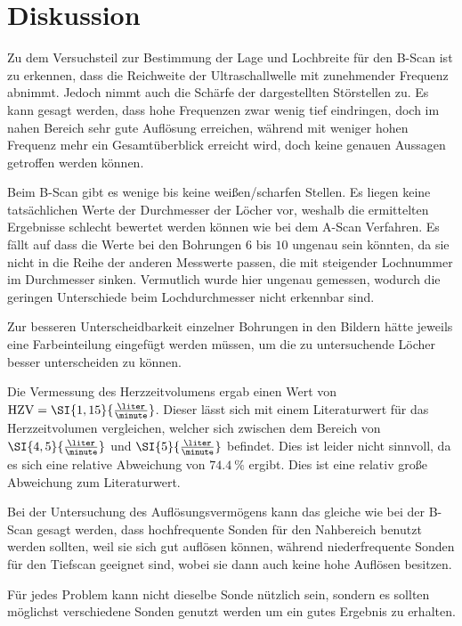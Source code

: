 \section{Diskussion}
\label{sec:Diskussion}
Zu dem Versuchsteil zur Bestimmung der Lage und Lochbreite für den B-Scan ist zu erkennen, dass die Reichweite der Ultraschallwelle mit zunehmender Frequenz abnimmt. Jedoch nimmt auch die Schärfe der dargestellten Störstellen zu. Es kann gesagt werden, dass hohe Frequenzen zwar wenig tief eindringen, doch im nahen Bereich sehr gute Auflösung erreichen, während mit weniger hohen Frequenz mehr ein Gesamtüberblick erreicht wird, doch keine genauen Aussagen getroffen werden können. 

Beim B-Scan gibt es wenige bis keine weißen/scharfen Stellen. Es liegen keine tatsächlichen Werte der Durchmesser der Löcher vor, weshalb die ermittelten Ergebnisse schlecht bewertet werden können wie bei dem A-Scan Verfahren. Es fällt auf dass die Werte bei den Bohrungen $6$ bis $10$ ungenau sein könnten, da sie nicht in die Reihe der anderen Messwerte passen, die mit steigender Lochnummer im Durchmesser sinken. Vermutlich wurde hier ungenau gemessen, wodurch die geringen Unterschiede beim Lochdurchmesser nicht erkennbar sind.

Zur besseren Unterscheidbarkeit einzelner Bohrungen in den Bildern hätte jeweils eine Farbeinteilung eingefügt werden müssen, um die zu untersuchende Löcher besser unterscheiden zu können. 

Die Vermessung des Herzzeitvolumens ergab einen Wert von $\text{HZV} = \SI{1,15}{\frac{\liter}{\minute}}$. Dieser lässt sich mit einem Literaturwert\cite{Herzzeitvolumen} für das Herzzeitvolumen vergleichen, welcher sich zwischen dem Bereich von $\SI{4,5}{\frac{\liter}{\minute}}$ und $\SI{5}{\frac{\liter}{\minute}}$ befindet. Dies ist leider nicht sinnvoll, da es sich eine relative Abweichung von $\SI{74,4}{\percent}$ ergibt. Dies ist eine relativ große Abweichung zum Literaturwert.

Bei der Untersuchung des Auflösungsvermögens kann das gleiche wie bei der B-Scan gesagt werden, dass hochfrequente Sonden für den Nahbereich benutzt werden sollten, weil sie sich gut auflösen können, während niederfrequente Sonden für den Tiefscan geeignet sind, wobei sie dann auch keine hohe Auflösen besitzen. 

Für jedes Problem kann nicht dieselbe Sonde nützlich sein, sondern es sollten möglichst verschiedene Sonden genutzt werden um ein gutes Ergebnis zu erhalten.